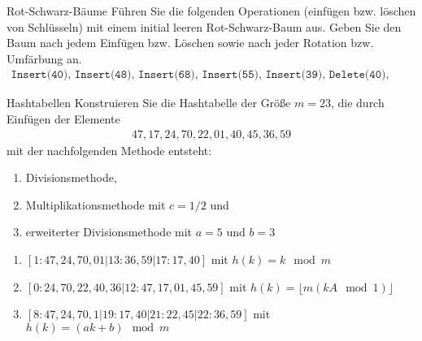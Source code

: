\documentclass{article}
\begin{document}
\begin{exercise}{Rot-Schwarz-Bäume}
  Führen Sie die folgenden Operationen (einfügen bzw. löschen von Schlüsseln) mit einem initial leeren Rot-Schwarz-Baum aus. Geben Sie den Baum nach jedem Einfügen bzw. Löschen sowie nach jeder Rotation bzw. Umfärbung an.
  \begin{align*}\texttt{Insert(40), Insert(48), Insert(68), Insert(55), Insert(39), Delete(40), Delete(48)}\end{align*}

  \begin{solution}
    
  \end{solution}
\end{exercise}

\begin{exercise}{Hashtabellen}
  Konstruieren Sie die Hashtabelle der Größe $m = 23$, die durch Einfügen der Elemente
  \begin{align*}47, 17, 24, 70, 22, 01, 40, 45, 36, 59\end{align*}
  mit der nachfolgenden Methode entsteht:
  \begin{enumerate}
    \item Divisionsmethode,
    \item Multiplikationsmethode mit $c = 1/2$ und
    \item erweiterter Divisionsmethode mit $a = 5$ und $b = 3$
  \end{enumerate}

  \begin{solution}
    \begin{enumerate}
      \item $[1: 47,24,70,01|13: 36,59|17: 17,40]$ mit $h(k) = k \mod m$
      \item $[0: 24,70,22,40,36|12:47,17,01,45,59]$ mit $h(k) = \lfloor m(kA \mod 1) \rfloor$
      \item $[8: 47,24,70,1|19: 17,40|21: 22,45|22: 36,59]$ mit $h(k) = (ak+b) \mod m$
    \end{enumerate}
  \end{solution}
\end{exercise}
\end{document}
